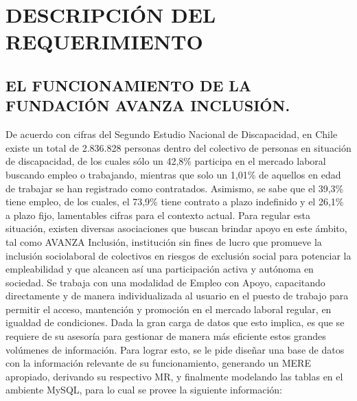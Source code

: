 \documentclass[letterpaper]{article}
\begin{document}
\section{DESCRIPCIÓN DEL REQUERIMIENTO}
\subsection{EL FUNCIONAMIENTO DE LA FUNDACIÓN AVANZA INCLUSIÓN.}

De acuerdo con cifras del Segundo Estudio Nacional de Discapacidad, en Chile existe un total de 2.836.828 personas dentro del colectivo de personas en situación de discapacidad, de los cuales sólo un 42,8\% participa en el mercado laboral buscando empleo o trabajando, mientras que solo un 1,01\% de aquellos en edad de trabajar se han registrado como contratados. Asimismo, se sabe que el 39,3\% tiene empleo, de los cuales, el 73,9\% tiene contrato a plazo indefinido y el 26,1\% a plazo fijo, lamentables cifras para el contexto actual. Para regular esta situación, existen diversas asociaciones que buscan brindar apoyo en este ámbito, tal como AVANZA Inclusión, institución sin fines de lucro que promueve la inclusión sociolaboral de colectivos en riesgos de exclusión social para potenciar la empleabilidad y que alcancen así una participación activa y autónoma en sociedad. Se trabaja con una modalidad de Empleo con Apoyo, capacitando directamente y de manera individualizada al usuario en el puesto de trabajo para permitir el acceso, mantención y promoción en el mercado laboral regular, en igualdad de condiciones. Dada la gran carga de datos que esto implica, es que se requiere de su asesoría para gestionar de manera más eficiente estos grandes volúmenes de información. Para lograr esto, se le pide diseñar una base de datos con la información relevante de su funcionamiento, generando un MERE apropiado, derivando su respectivo MR, y finalmente modelando las tablas en el ambiente MySQL, para lo cual se provee la siguiente información:
\end{document}
